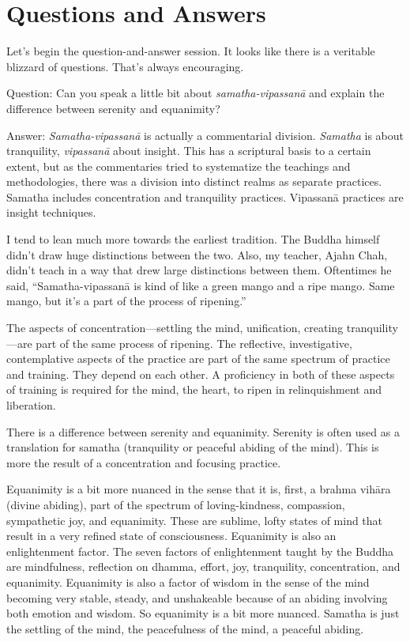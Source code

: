 \chapter{Questions and Answers}

Let’s begin the question-and-answer session. It looks like there is a
veritable blizzard of questions. That’s always encouraging.

\vspace{\the\qaskip}
Question: Can you speak a little bit about \emph{samatha-vipassanā} and
explain the difference between serenity and equanimity?

\vspace{\the\qaskip}
Answer: \emph{Samatha-vipassanā} is actually a commentarial division.
\emph{Samatha} is about tranquility, \emph{vipassanā} about insight.
This has a scriptural basis to a certain extent, but as the commentaries
tried to systematize the teachings and methodologies, there was a
division into distinct realms as separate practices. Samatha includes
concentration and tranquility practices. Vipassanā practices are insight
techniques.

I tend to lean much more towards the earliest tradition. The Buddha
himself didn’t draw huge distinctions between the two. Also, my teacher,
Ajahn Chah, didn’t teach in a way that drew large distinctions between
them. Oftentimes he said, “Samatha-vipassanā is kind of like a green
mango and a ripe mango. Same mango, but it’s a part of the process of
ripening.”

The aspects of concentration—settling the mind, unification, creating
tranquility—are part of the same process of ripening. The reflective,
investigative, contemplative aspects of the practice are part of the
same spectrum of practice and training. They depend on each other. A
proficiency in both of these aspects of training is required for the
mind, the heart, to ripen in relinquishment and liberation.

There is a difference between serenity and equanimity. Serenity is often
used as a translation for samatha (tranquility or peaceful abiding of
the mind). This is more the result of a concentration and focusing
practice.

Equanimity is a bit more nuanced in the sense that it is, first, a
brahma vihāra (divine abiding), part of the spectrum of loving-kindness,
compassion, sympathetic joy, and equanimity. These are sublime, lofty
states of mind that result in a very refined state of consciousness.
Equanimity is also an enlightenment factor. The seven factors of
enlightenment taught by the Buddha are mindfulness, reflection on
dhamma, effort, joy, tranquility, concentration, and equanimity.
Equanimity is also a factor of wisdom in the sense of the mind becoming
very stable, steady, and unshakeable because of an abiding involving
both emotion and wisdom. So equanimity is a bit more nuanced. Samatha is
just the settling of the mind, the peacefulness of the mind, a peaceful
abiding.

